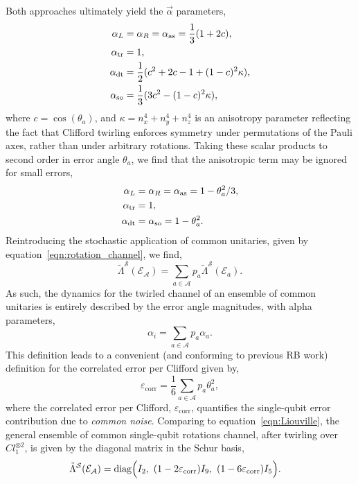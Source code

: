 Both approaches ultimately yield the $\vec\alpha$ parameters,
\begin{subequations}
\begin{align}
    \alpha_{L}&=\alpha_R=\alpha_{\rm as}=\frac{1}{3}(1+2c),\\
    \alpha_{\rm tr}&=1,\\
    \alpha_{\rm dt}&=\frac{1}{2}(c^2+2c-1+(1-c)^2\kappa),\\
    \alpha_{\rm so}&=\frac{1}{3}(3c^2-(1-c)^2\kappa),
\end{align}
\end{subequations}
where $c=\cos(\theta_a)$,  and $\kappa=n_x^4+n_y^4+n_z^4$ is an anisotropy parameter reflecting the fact that Clifford twirling enforces symmetry under permutations of the Pauli axes, rather than under arbitrary rotations.
Taking these scalar products to second order in error angle $\theta_a$,
we find that the anisotropic term may be ignored for small errors,
\begin{subequations}
\begin{align}
        \alpha_L&=\alpha_R=\alpha_{\rm as}= 1- \theta_a^2/3, \\
        \alpha_{\rm tr} &= 1,\\
        \alpha_{\rm dt} &= \alpha_{\rm so} = 1- \theta_a^2. 
\end{align}
\end{subequations}
Reintroducing the stochastic application of common unitaries, given by equation~\ref{eqn:rotation_channel}, we find,
\begin{equation}
\tilde \Lambda^\mathcal{S}(\mathcal{E}_\mathcal{A})=\sum_{a\in\mathcal{A}} p_a \tilde \Lambda^\mathcal{S}(\mathcal{E}_a).
\end{equation}
As such, the dynamics for the twirled channel of an ensemble of common unitaries is entirely described by the error angle magnitudes, with alpha parameters,
\begin{equation}
\alpha_i = \sum_{a\in\mathcal{A}} p_a \alpha_a.
\end{equation}
This definition leads to a convenient (and conforming to previous RB work) definition for the correlated error per Clifford given by,
\begin{equation}
\label{eqn:e_corr}
\varepsilon_\mathrm{corr}=\frac{1}{6}\sum_{a\in\mathcal{A}}p_a\theta_a^2,
\end{equation}
where the correlated error per Clifford, $\varepsilon_\mathrm{corr}$, quantifies the single-qubit error contribution due to \textit{common noise}.
Comparing to equation~\ref{eqn:Liouville}, the general ensemble of common single-qubit rotations channel, after twirling over $Cl_1^{\otimes 2}$, is given by the diagonal matrix in the Schur basis,
\begin{equation}
\begin{split}
    \tilde\Lambda^\mathcal{S}(\mathcal{E}_\mathcal{A}) &= \mathrm{diag}\Bigl(
        I_2,
        ~(1-2\varepsilon_{\rm corr}) I_9,
        ~(1-6\varepsilon_{\rm corr}) I_5
        \Bigr).
\end{split}
\end{equation}

